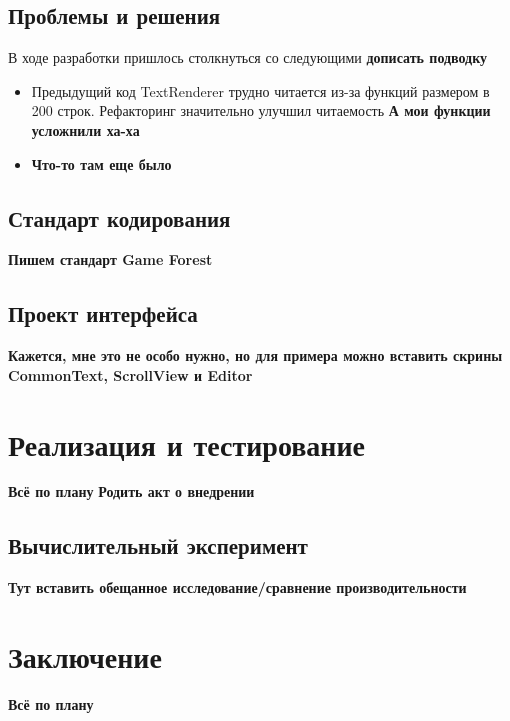 \documentclass{fefu}
\begin{document}
		\subsection{Проблемы и решения}
			\par В ходе разработки пришлось столкнуться со следующими \textbf{дописать 
			подводку}
			\begin{itemize}
				\item Предыдущий код TextRenderer трудно читается из-за функций размером в
				200 строк. Рефакторинг значительно улучшил читаемость \textbf{А мои функции 
				усложнили ха-ха}
				\item \textbf{Что-то там еще было}
			\end{itemize}
		\subsection{Стандарт кодирования}
			\textbf{Пишем стандарт Game Forest}
		\subsection{Проект интерфейса}
			\textbf{Кажется, мне это не особо нужно, но для примера можно вставить скрины
			CommonText, ScrollView и Editor}
	\section{Реализация и тестирование}
		\textbf{Всё по плану}
		\textbf{Родить акт о внедрении}
		\subsection{Вычислительный эксперимент}
			\textbf{Тут вставить обещанное исследование/сравнение производительности}
	\section*{Заключение}
		\textbf{Всё по плану}
	\newpage
	
	
	
\end{document}
